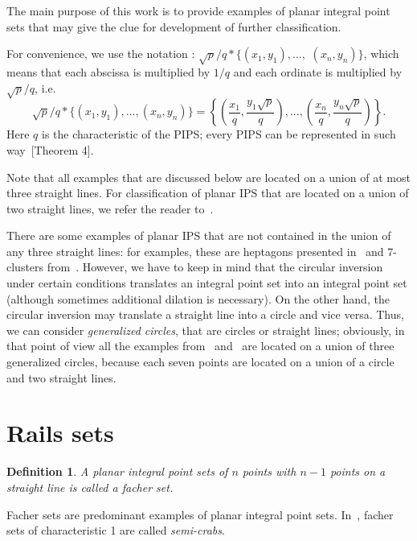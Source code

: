 \documentclass[12pt]{article}
\theoremstyle{theorem}
\theoremstyle{dfn}
\newtheorem{dfn}{Definition}
\theoremstyle{remark}
\begin{document}
The main purpose of this work is to provide examples of planar integral point sets
that may give the clue for development of further classification.

For convenience, we use the notation \cite{our-ped-2018,our-pmm-2018,our-vmmsh-2018}:
$\sqrt{p}/q * \{ (x_1,y_1), ...,$ $ (x_n, y_n)  \}$,
which means that each abscissa is multiplied by $1/q$
and each ordinate is multiplied by $\sqrt{p}/q$,  i.e.
\begin{equation}
	\label{eq:char_lattice}
	\sqrt{p}/q * \{ (x_1,y_1), ..., (x_n, y_n)  \}
	=
	\left\{ \left(\frac{x_1}{q},\frac{y_1\sqrt{p}}{q}\right), ..., \left(\frac{x_n}{q},   \frac{y_n\sqrt{p}}{q}\right)  \right\}
	.
\end{equation}
Here $q$ is the characteristic of the PIPS;
every PIPS can be represented in such way~\cite{our-vmmsh-2018-translit}[Theorem 4].

Note that all examples that are discussed below are
located on a union of at most three straight lines.
For classification of planar IPS that are located on a union of two straight lines,
we refer the reader to~\cite{avdeev2019particular}.

There are some examples of planar IPS that are not contained in the union of any three straight lines:
for examples, these are heptagons presented in~\cite{kreisel2008heptagon} and 7-clusters from~\cite{kurz2013constructing}.
However, we have to keep in mind that the circular inversion under certain conditions
translates an integral point set into an integral point set
(although sometimes additional dilation is necessary).
On the other hand, the circular inversion may translate a straight line into a circle and vice versa.
Thus, we can consider \emph{generalized circles}, that are circles or straight lines;
obviously, in that point of view all the examples from~\cite{kreisel2008heptagon} and~\cite{kurz2013constructing}
are located on a union of three generalized circles,
because each seven points are located on a union of a circle and two straight lines.




\section{Rails sets}

\begin{dfn}
	A planar integral point sets of $n$ points with $n-1$ points on a straight line is called
	a \textit{facher} set.
\end{dfn}
Facher sets are predominant examples of planar integral point sets.
In~\cite{antonov2008maximal}, facher sets of characteristic 1 are called \textit{semi-crabs}.
\end{document}
